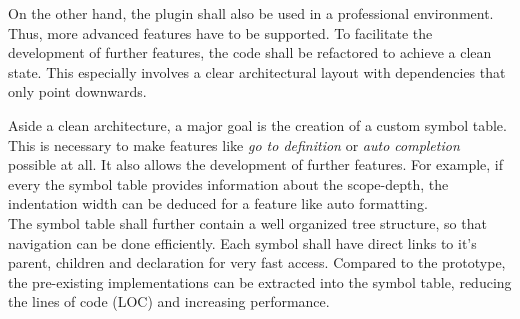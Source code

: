 On the other hand, the plugin shall also be used in a professional environment.
Thus, more advanced features have to be supported.
To facilitate the development of further features, the code shall be refactored to achieve a clean state.
This especially involves a clear architectural layout with dependencies that only point downwards.

Aside a clean architecture, a major goal is the creation of a custom symbol table.
This is necessary to make features like \textit{go to definition} or \textit{auto completion} possible at all.
It also allows the development of further features.
For example, if every the symbol table provides information about the scope-depth, the indentation width can be deduced for a feature like auto formatting.\\

The symbol table shall further contain a well organized tree structure, so that navigation can be done efficiently.
Each symbol shall have direct links to it's parent, children and declaration for very fast access.
Compared to the prototype, the pre-existing implementations can be extracted into the symbol table, reducing the lines of code (LOC) and increasing performance.
